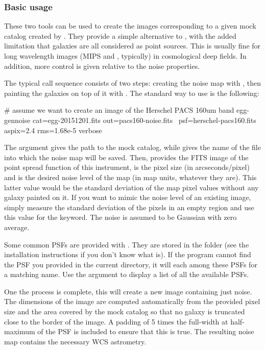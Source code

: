\subsubsection{Basic usage}

These two tools can be used to create the images corresponding to a given mock catalog created by . They provide a simple alternative to \skymaker, with the added limitation that galaxies are all considered as point sources. This is usually fine for long wavelength images (\spitzer MIPS and \herschel, typically) in cosmological deep fields. In addition, more control is given relative to the noise properties.

The typical call sequence consists of two steps: creating the noise map with , then painting the galaxies on top of it with . The standard way to use  is the following:
\begin{bashcode}
# assume we want to create an image of the Herschel PACS 160um band
egg-gennoise cat=egg-20151201.fits out=pacs160-noise.fits \
    psf=herschel-pacs160.fits aspix=2.4 rms=1.68e-5 verbose
\end{bashcode}
The argument  gives the path to the mock catalog, while  gives the name of the file into which the noise map will be saved. Then,  provides the FITS image of the point spread function of this instrument,  is the pixel size (in arcseconds/pixel) and  is the desired noise level of the map (in map units, whatever they are). This latter value would be the standard deviation of the map pixel values without any galaxy painted on it. If you want to mimic the noise level of an existing image, simply measure the standard deviation of the pixels in an empty region and use this value for the  keyword. The noise is assumed to be Gaussian with zero average.

Some common PSFs are provided with \egg. They are stored in the  folder (see the installation instructions if you don't know what  is). If the program cannot find the PSF you provided in the current directory, it will each among these PSFs for a matching name. Use the  argument to display a list of all the available PSFs.

One the process is complete, this will create a new image containing just noise. The dimensions of the image are computed automatically from the provided pixel size and the area covered by the mock catalog so that no galaxy is truncated close to the border of the image. A padding of 5 times the full-width at half-maximum of the PSF is included to ensure that this is true. The resulting noise map contains the necessary WCS astrometry.

